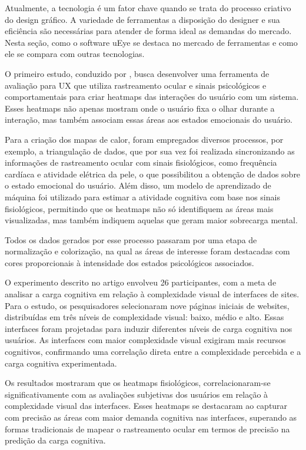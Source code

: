 Atualmente, a tecnologia é um fator chave quando se trata do processo criativo do design gráfico. A variedade de ferramentas a disposição do designer e sua eficiência são necessárias para atender de forma ideal as demandas do mercado. Nesta seção, como o software uEye se destaca no mercado de ferramentas e como ele se compara com outras tecnologias.


O primeiro estudo, conduzido por \textcite{GEORGES2016}, busca desenvolver uma ferramenta de avaliação para UX que utiliza rastreamento ocular e sinais psicológicos e comportamentais para criar heatmaps das interações do usuário com um sistema. Esses heatmaps não apenas mostram onde o usuário fixa o olhar durante a interação, mas também associam essas áreas aos estados emocionais do usuário.

Para a criação dos mapas de calor, foram empregados diversos processos, por exemplo, a triangulação de dados, que por sua vez foi realizada sincronizando as informações de rastreamento ocular com sinais fisiológicos, como frequência cardíaca e atividade elétrica da pele, o que possibilitou a obtenção de dados sobre o estado emocional do usuário. Além disso, um modelo de aprendizado de máquina foi utilizado para estimar a atividade cognitiva com base nos sinais fisiológicos, permitindo que os heatmaps não só identifiquem as áreas mais visualizadas, mas também indiquem aquelas que geram maior sobrecarga mental. 

Todos os dados gerados por esse processo passaram por uma etapa de normalização e colorização, na qual as áreas de interesse foram destacadas com cores proporcionais à intensidade dos estados psicológicos associados.

O experimento descrito no artigo envolveu 26 participantes, com a meta de analisar a carga cognitiva em relação à complexidade visual de interfaces de sites. Para o estudo, os pesquisadores selecionaram nove páginas iniciais de websites, distribuídas em três níveis de complexidade visual: baixo, médio e alto. Essas interfaces foram projetadas para induzir diferentes níveis de carga cognitiva nos usuários. As interfaces com maior complexidade visual exigiram mais recursos cognitivos, confirmando uma correlação direta entre a complexidade percebida e a carga cognitiva experimentada.

Os resultados mostraram que os heatmaps fisiológicos, correlacionaram-se significativamente com as avaliações subjetivas dos usuários em relação à complexidade visual das interfaces. Esses heatmaps se destacaram ao capturar com precisão as áreas com maior demanda cognitiva nas interfaces, superando as formas tradicionais de mapear o rastreamento ocular em termos de precisão na predição da carga cognitiva.
